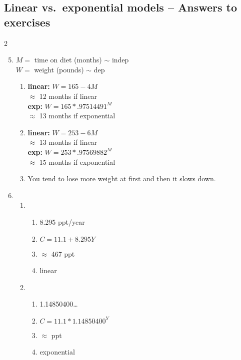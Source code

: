 \subsection {Linear vs.\ exponential models -- Answers to exercises} %

\begin{multicols} {2}
\begin{enumerate}
\setcounter{enumi}{4}

\item %
$M=$ time on diet (months) $\sim$ indep \\ $W=$ weight (pounds) $\sim$ dep
\begin{enumerate}
\item \textbf{linear:} $W=165-4M$ \\ $\approx$ 12 months if linear \\
\textbf{exp:} $W=165 \ast .97514491^M$ \\ $\approx$ 13 months if exponential
\item \textbf{linear:} $W =253-6M $ \\$\approx$ 13 months if linear \\
\textbf{exp:} $W = 253\ast .97569882^M$ \\ $\approx$ 15 months if exponential
\item You tend to lose more weight at first and then it slows down.
\end{enumerate}

\item %
\begin{enumerate}
\item 
\begin{enumerate}
\item 8.295 ppt/year
\item $C=11.1 + 8.295Y$
\item $\approx$ 467 ppt
\item linear
\end{enumerate}
\item 
\begin{enumerate}
\item 1.14850400\ldots
\item $C=11.1\ast1.14850400^Y$
\item $\approx$  ppt
\item exponential
\end{enumerate}
\end{enumerate}


\end{enumerate}
\end{multicols}
